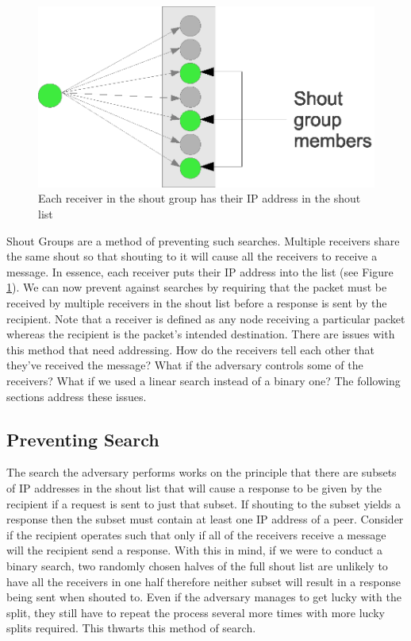 \documentclass[ %
                    author={Luke Murray},
                supervisor={Dr. Simon Hollis},
                     title={Shadow Peer-to-Peer Networks},
                  subtitle={},
                    degree={MEng},
                      year={2013} ]{thesis}
\begin{document}
\begin{figure}[h]
    \centering
    \includegraphics{diagrams/shout_group_def.eps}
    \caption{Each receiver in the shout group has their IP address in the shout list}
    \label{shoutgroupdef}
\end{figure}

Shout Groups are a method of preventing such searches. Multiple receivers share the same shout so that shouting to it will cause all the receivers to receive a message. In essence, each receiver puts their IP address into the list (see Figure \ref{shoutgroupdef}). We can now prevent against searches by requiring that the packet must be received by multiple receivers in the shout list before a response is sent by the recipient. Note that a receiver is defined as any node receiving a particular packet whereas the recipient is the packet's intended destination. There are issues with this method that need addressing. How do the receivers tell each other that they've received the message? What if the adversary controls some of the receivers? What if we used a linear search instead of a binary one? The following sections address these issues.

\subsection{Preventing Search}

The search the adversary performs works on the principle that there are subsets of IP addresses in the shout list that will cause a response to be given by the recipient if a request is sent to just that subset. If shouting to the subset yields a response then the subset must contain at least one IP address of a peer. Consider if the recipient operates such that only if all of the receivers receive a message will the recipient send a response. With this in mind, if we were to conduct a binary search, two randomly chosen halves of the full shout list are unlikely to have all the receivers in one half therefore neither subset will result in a response being sent when shouted to. Even if the adversary manages to get lucky with the split, they still have to repeat the process several more times with more lucky splits required. This thwarts this method of search.
\end{document}
